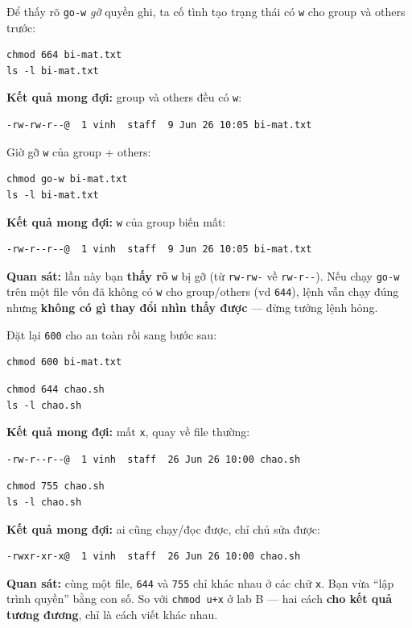 \documentclass[12pt,a4paper]{article}
\newcommand{\cmd}[1]{\texttt{#1}}
\begin{document}
\begin{labbox}
Để thấy rõ \cmd{go-w} \textit{gỡ} quyền ghi, ta cố tình tạo trạng thái có \cmd{w}
cho group và others trước:
\begin{Verbatim}
chmod 664 bi-mat.txt
ls -l bi-mat.txt
\end{Verbatim}
\textbf{Kết quả mong đợi:} group và others đều có \cmd{w}:
\begin{Verbatim}
-rw-rw-r--@  1 vinh  staff  9 Jun 26 10:05 bi-mat.txt
\end{Verbatim}
Giờ gỡ \cmd{w} của group + others:
\begin{Verbatim}
chmod go-w bi-mat.txt
ls -l bi-mat.txt
\end{Verbatim}
\textbf{Kết quả mong đợi:} \cmd{w} của group biến mất:
\begin{Verbatim}
-rw-r--r--@  1 vinh  staff  9 Jun 26 10:05 bi-mat.txt
\end{Verbatim}
\textbf{Quan sát:} lần này bạn \textbf{thấy rõ} \cmd{w} bị gỡ (từ \cmd{rw-rw-} về
\cmd{rw-r-{}-}). Nếu chạy \cmd{go-w} trên một file vốn đã không có \cmd{w} cho
group/others (vd \cmd{644}), lệnh vẫn chạy đúng nhưng \textbf{không có gì thay đổi
nhìn thấy được} --- đừng tưởng lệnh hỏng.

Đặt lại \cmd{600} cho an toàn rồi sang bước sau:
\begin{Verbatim}
chmod 600 bi-mat.txt
\end{Verbatim}
\end{labbox}

\begin{labbox}
\begin{Verbatim}
chmod 644 chao.sh
ls -l chao.sh
\end{Verbatim}
\textbf{Kết quả mong đợi:} mất \cmd{x}, quay về file thường:
\begin{Verbatim}
-rw-r--r--@  1 vinh  staff  26 Jun 26 10:00 chao.sh
\end{Verbatim}

\begin{Verbatim}
chmod 755 chao.sh
ls -l chao.sh
\end{Verbatim}
\textbf{Kết quả mong đợi:} ai cũng chạy/đọc được, chỉ chủ sửa được:
\begin{Verbatim}
-rwxr-xr-x@  1 vinh  staff  26 Jun 26 10:00 chao.sh
\end{Verbatim}

\textbf{Quan sát:} cùng một file, \cmd{644} và \cmd{755} chỉ khác nhau ở các chữ
\cmd{x}. Bạn vừa ``lập trình quyền'' bằng con số. So với \cmd{chmod u+x} ở lab B ---
hai cách \textbf{cho kết quả tương đương}, chỉ là cách viết khác nhau.
\end{labbox}
\end{document}
